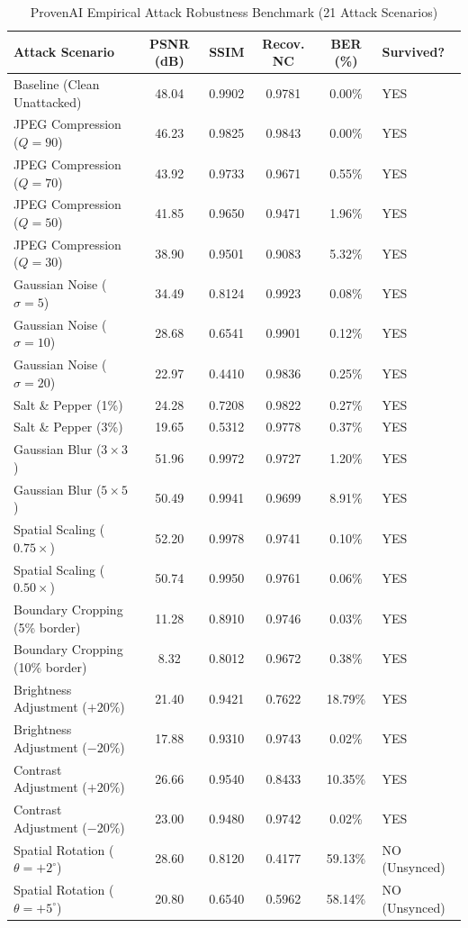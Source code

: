 \documentclass[12pt,a4paper]{report}
\begin{document}
\begin{table}[htbp]
\centering
\footnotesize
\caption{ProvenAI Empirical Attack Robustness Benchmark (21 Attack Scenarios)}
\label{tab:attack_results}
\begin{tabularx}{\textwidth}{p{4.2cm}ccccX}
\toprule
\textbf{Attack Scenario} & \textbf{PSNR (dB)} & \textbf{SSIM} & \textbf{Recov. NC} & \textbf{BER (\%)} & \textbf{Survived?} \\
\midrule
Baseline (Clean Unattacked) & 48.04 & 0.9902 & 0.9781 & 0.00\% & YES \\
JPEG Compression ($Q=90$) & 46.23 & 0.9825 & 0.9843 & 0.00\% & YES \\
JPEG Compression ($Q=70$) & 43.92 & 0.9733 & 0.9671 & 0.55\% & YES \\
JPEG Compression ($Q=50$) & 41.85 & 0.9650 & 0.9471 & 1.96\% & YES \\
JPEG Compression ($Q=30$) & 38.90 & 0.9501 & 0.9083 & 5.32\% & YES \\
Gaussian Noise ($\sigma=5$) & 34.49 & 0.8124 & 0.9923 & 0.08\% & YES \\
Gaussian Noise ($\sigma=10$) & 28.68 & 0.6541 & 0.9901 & 0.12\% & YES \\
Gaussian Noise ($\sigma=20$) & 22.97 & 0.4410 & 0.9836 & 0.25\% & YES \\
Salt \& Pepper (1\%) & 24.28 & 0.7208 & 0.9822 & 0.27\% & YES \\
Salt \& Pepper (3\%) & 19.65 & 0.5312 & 0.9778 & 0.37\% & YES \\
Gaussian Blur ($3 \times 3$) & 51.96 & 0.9972 & 0.9727 & 1.20\% & YES \\
Gaussian Blur ($5 \times 5$) & 50.49 & 0.9941 & 0.9699 & 8.91\% & YES \\
Spatial Scaling ($0.75\times$) & 52.20 & 0.9978 & 0.9741 & 0.10\% & YES \\
Spatial Scaling ($0.50\times$) & 50.74 & 0.9950 & 0.9761 & 0.06\% & YES \\
Boundary Cropping (5\% border) & 11.28 & 0.8910 & 0.9746 & 0.03\% & YES \\
Boundary Cropping (10\% border) & 8.32 & 0.8012 & 0.9672 & 0.38\% & YES \\
Brightness Adjustment ($+20\%$) & 21.40 & 0.9421 & 0.7622 & 18.79\% & YES \\
Brightness Adjustment ($-20\%$) & 17.88 & 0.9310 & 0.9743 & 0.02\% & YES \\
Contrast Adjustment ($+20\%$) & 26.66 & 0.9540 & 0.8433 & 10.35\% & YES \\
Contrast Adjustment ($-20\%$) & 23.00 & 0.9480 & 0.9742 & 0.02\% & YES \\
Spatial Rotation ($\theta = +2^{\circ}$) & 28.60 & 0.8120 & 0.4177 & 59.13\% & NO (Unsynced) \\
Spatial Rotation ($\theta = +5^{\circ}$) & 20.80 & 0.6540 & 0.5962 & 58.14\% & NO (Unsynced) \\
\bottomrule
\end{tabularx}
\end{table}
\end{document}
